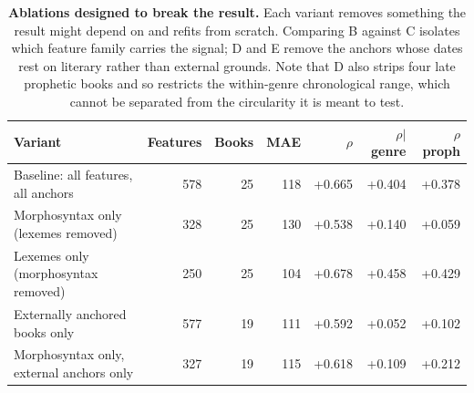 \begin{table}[!ht]
\centering
\footnotesize
\caption{{\bf Ablations designed to break the result.}  Each variant removes something the result might depend on and refits from scratch.  Comparing B against C isolates which feature family carries the signal; D and E remove the anchors whose dates rest on literary rather than external grounds.  Note that D also strips four late prophetic books and so restricts the within-genre chronological range, which cannot be separated from the circularity it is meant to test.}
\label{tab:s10}
\begin{tabular}{lrrrrrr}
\toprule
\textbf{Variant} & \textbf{Features} & \textbf{Books} & \textbf{MAE} & \textbf{$\rho$} & \textbf{$\rho|$genre} & \textbf{$\rho$ proph} \\
\midrule
Baseline: all features, all anchors & 578 & 25 & 118 & +0.665 & +0.404 & +0.378 \\
Morphosyntax only (lexemes removed) & 328 & 25 & 130 & +0.538 & +0.140 & +0.059 \\
Lexemes only (morphosyntax removed) & 250 & 25 & 104 & +0.678 & +0.458 & +0.429 \\
Externally anchored books only & 577 & 19 & 111 & +0.592 & +0.052 & +0.102 \\
Morphosyntax only, external anchors only & 327 & 19 & 115 & +0.618 & +0.109 & +0.212 \\
\bottomrule
\end{tabular}
\end{table}
